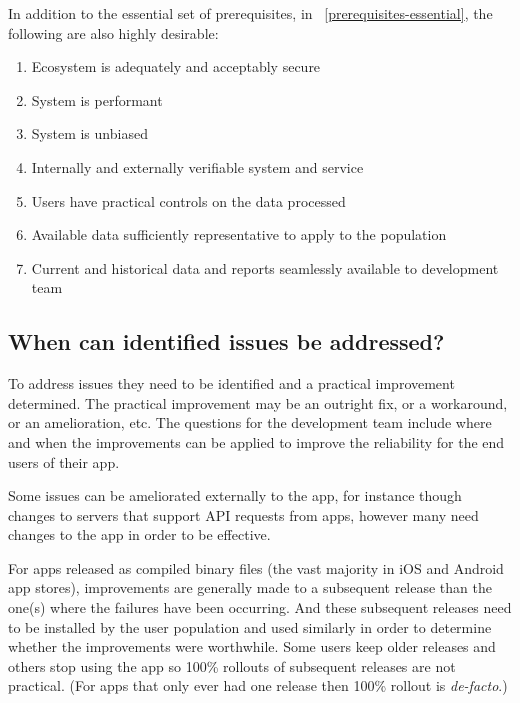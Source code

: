 In addition to the essential set of prerequisites, in ~\ref{prerequisites-essential}, the following are also highly desirable:
{\small
\begin{enumerate} [i]
    \itemsep0em
    \item Ecosystem is adequately and acceptably secure
    \item System is performant
    \item System is unbiased
    \item Internally and externally verifiable system and service
    \item Users have practical controls on the data processed
    \item Available data sufficiently representative to apply to the population
    \item Current and historical data and reports seamlessly available to development team
    \label{prerequisites-desirable}
\end{enumerate}
}

\subsection{When can identified issues be addressed?}
To address issues they need to be identified and a practical improvement determined. The practical improvement may be an outright fix, or a workaround, or an amelioration, etc. The questions for the development team include where and when the improvements can be applied to improve the reliability for the end users of their app.

Some issues can be ameliorated externally to the app, for instance though changes to servers that support API requests from apps, however many need changes to the app in order to be effective.

For apps released as compiled binary files (the vast majority in iOS and Android app stores), improvements are generally made to a subsequent release than the one(s) where the failures have been occurring\footnotemark. And these subsequent releases need to be installed by the user population and used similarly in order to determine whether the improvements were worthwhile. Some users keep older releases and others stop using the app so 100\% rollouts of subsequent releases are not practical. (For apps that only ever had one release then 100\% rollout is \emph{de-facto}.)

